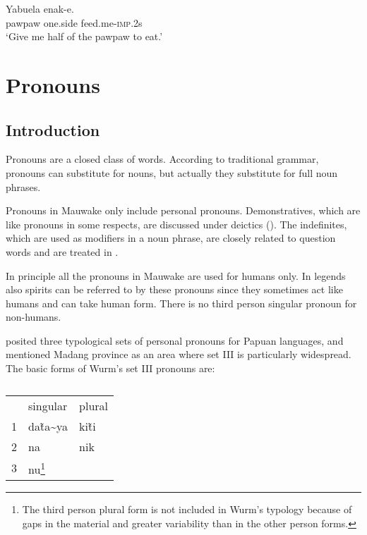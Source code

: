 \ea%
\label{ex:x104}
\gll Yabuela  enak-e. \\
pawpaw one.side feed.me-\textsc{imp}.2s\\
\glt`Give me half of the pawpaw to eat.'
\z

\section{Pronouns}\footnotemark{}
{}
\subsection{Introduction}
{}
Pronouns are a closed class of words. According to traditional grammar, pronouns can substitute for nouns, but actually they substitute for full noun phrases. 

Pronouns in Mauwake only include personal pronouns. Demonstratives, which are like pronouns in some respects, are discussed under deictics (). The indefinites, which are used as modifiers in a noun phrase, are closely related to question words and are treated in .

In principle all the pronouns in Mauwake are used for humans only. In legends also spirits can be referred to by these pronouns since they sometimes act like humans and can take human form. There is no third person singular pronoun for non-humans. 

\citet{Wurm1982} posited three typological sets of personal pronouns for Papuan languages, and mentioned Madang province as an area where set III is particularly widespread. The basic forms of Wurm's set III pronouns are:

\begin{table}
\caption{}
\label{} 
\begin{tabular}{lll}
 &singular &plural\\
1 &da\~{ta\~{}ya} &ki\~{ti}\\
2 &na &nik\\
3 &nu\footnote{The third person plural form is not included in Wurm's typology because of gaps in the material and greater variability than in the other person forms.} &\citep[40--42]{Wurm1982}\\
\end{tabular}
\end{table}


